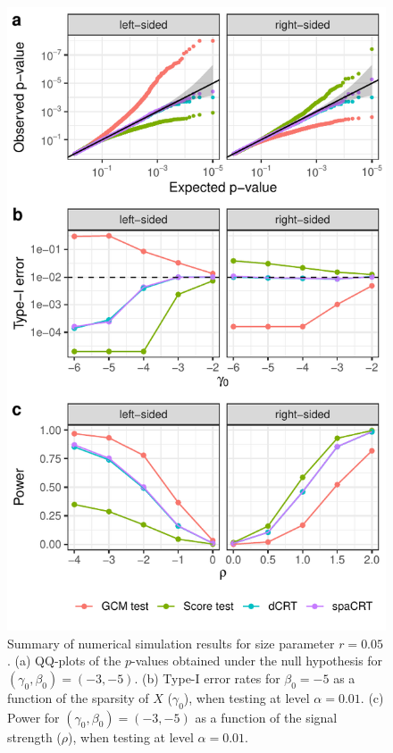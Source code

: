 \documentclass[12pt]{article}
\theoremstyle{definition}
\newcommand{\srx}{X}									%
\begin{document}
\begin{figure}[h!]
	\centering
	\includegraphics{figures-and-tables/simulation-summary.pdf}
	\caption{Summary of numerical simulation results for size parameter $r = 0.05$. (a) QQ-plots of the $p$-values obtained under the null hypothesis for $(\gamma_0, \beta_0) = (-3, -5)$. (b) Type-I error rates for $\beta_0 = -5$ as a function of the sparsity of $\srx$ ($\gamma_0$), when testing at level $\alpha = 0.01$. (c) Power for $(\gamma_0, \beta_0) = (-3, -5)$ as a function of the signal strength ($\rho$), when testing at level $\alpha = 0.01$.}
	\label{fig:simulation-summary}
\end{figure}
\end{document}
